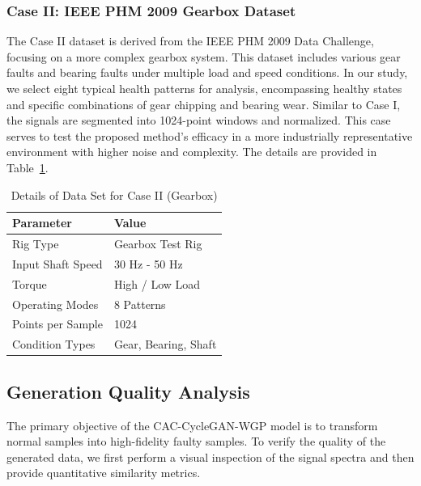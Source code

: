 \subsubsection{Case II: IEEE PHM 2009 Gearbox Dataset}
The Case II dataset is derived from the IEEE PHM 2009 Data Challenge, focusing on a more complex gearbox system. This dataset includes various gear faults and bearing faults under multiple load and speed conditions. In our study, we select eight typical health patterns for analysis, encompassing healthy states and specific combinations of gear chipping and bearing wear. Similar to Case I, the signals are segmented into 1024-point windows and normalized. This case serves to test the proposed method's efficacy in a more industrially representative environment with higher noise and complexity. The details are provided in Table~\ref{tab:case2_details}.

\begin{table}[htbp]
\centering
\caption{Details of Data Set for Case II (Gearbox)}
\label{tab:case2_details}
\begin{tabular}{ll}
\hline
\textbf{Parameter} & \textbf{Value} \\ \hline
Rig Type & Gearbox Test Rig \\
Input Shaft Speed & 30 Hz - 50 Hz \\
Torque & High / Low Load \\
Operating Modes & 8 Patterns \\
Points per Sample & 1024 \\
Condition Types & Gear, Bearing, Shaft \\
\hline
\end{tabular}
\end{table}

\subsection{Generation Quality Analysis}
The primary objective of the CAC-CycleGAN-WGP model is to transform normal samples into high-fidelity faulty samples. To verify the quality of the generated data, we first perform a visual inspection of the signal spectra and then provide quantitative similarity metrics.

